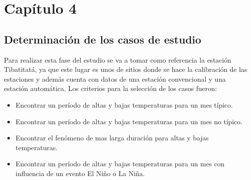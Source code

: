 \chapter{Capítulo 4}



\section{Determinación de los casos de estudio}%


Para realizar esta fase del estudio se va a tomar como referencia la estación Tibatitatá, ya que este lugar es unos de sitios donde se hace la calibración de las estaciones y además cuenta con datos de una estación convencional y una estación automática. Los criterios para la selección de los casos fueron:

\begin{itemize}
    \item Encontrar un período de altas y bajas temperaturas para un mes típico.
    
    \item Encontrar un período de altas y bajas temperaturas para un mes no típico.
    
    \item Encontrar el fenómeno de mas larga duración para altas y bajas temperaturas.
    
    \item Encontrar un período de altas y bajas temperaturas para un mes con influencia de un evento El Niño o La Niña.
\end{itemize}

